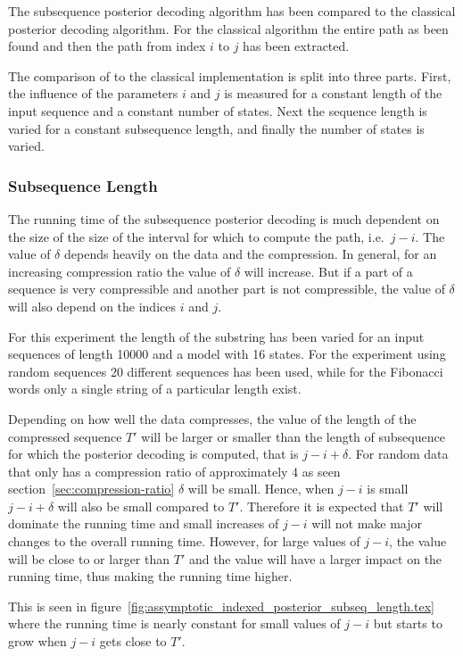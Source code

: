 The subsequence posterior decoding algorithm has been compared to the classical
posterior decoding algorithm. For the classical algorithm the entire path as
been found and then the path from index $i$ to $j$ has been extracted.

The comparison of to the classical implementation is split into three
parts. First, the influence of the parameters $i$ and $j$ is measured for a
constant length of the input sequence and a constant number of states. Next the
sequence length is varied for a constant subsequence length, and finally the
number of states is varied.

\subsubsection{Subsequence Length}

The running time of the subsequence posterior decoding is much dependent on the
size of the size of the interval for which to compute the path, i.e.\
$j-i$. The value of $\delta$ depends heavily on the data and the
compression. In general, for an increasing compression ratio the value of
$\delta$ will increase. But if a part of a sequence is very compressible and
another part is not compressible, the value of $\delta$ will also depend on the
indices $i$ and $j$.

For this experiment the length of the substring has been varied for an input
sequences of length 10000 and a model with 16 states. For the experiment using
random sequences 20 different sequences has been used, while for the Fibonacci
words only a single string of a particular length exist.

Depending on how well the data compresses, the value of the length of the
compressed sequence $T'$ will be larger or smaller than the length of
subsequence for which the posterior decoding is computed, that is
$j - i + \delta$.  For random data that only has a compression ratio of
approximately 4 as seen section~\ref{sec:compression-ratio} $\delta$ will be
small. Hence, when $j - i$ is small $j - i + \delta$ will also be small
compared to $T'$. Therefore it is expected that $T'$ will dominate the running
time and small increases of $j - i$ will not make major changes to the overall
running time. However, for large values of $j - i$, the value will be close to
or larger than $T'$ and the value will have a larger impact on the running
time, thus making the running time higher.

This is seen in
figure~\ref{fig:assymptotic_indexed_posterior_subseq_length.tex} where the
running time is nearly constant for small values of $j - i$ but starts to grow
when $j - i$ gets close to $T'$.

